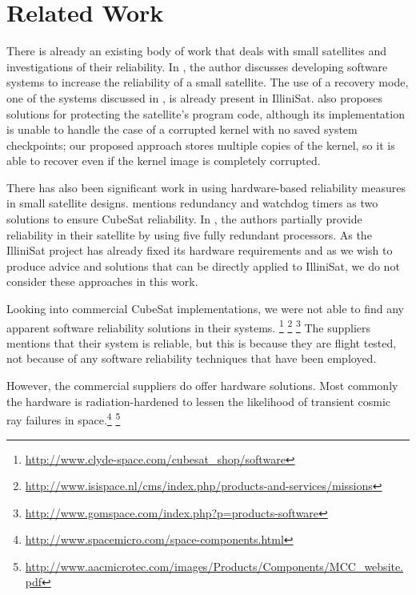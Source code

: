 \section{Related Work}\label{sec:related_work}
There is already an existing body of work that deals with small satellites and
investigations of their reliability.  In \cite{odegaard2013error}, the author
discusses developing software systems to increase the reliability of a small satellite.
The use of a recovery mode, one of the systems discussed in
\cite{odegaard2013error}, is already present in IlliniSat.
\cite{odegaard2013error} also proposes solutions for protecting the satellite's
program code, although its implementation is unable to handle the case of a
corrupted kernel with no saved system checkpoints; our proposed approach stores
multiple copies of the kernel, so it is able to recover even if the kernel image
is completely corrupted.

There has also been significant work in using hardware-based reliability measures in small satellite designs.  \cite{toorian2008cubesat} mentions redundancy and watchdog timers as two solutions to ensure CubeSat reliability.  In \cite{passerone2008design}, the authors partially provide reliability in their satellite by using five fully redundant processors.   As the IlliniSat project has already fixed its hardware requirements and as we wish to produce advice and solutions that can be directly applied to IlliniSat, we do not consider these approaches in this work.


Looking into commercial CubeSat implementations, we were not able to 
find any apparent software reliability solutions in their systems.
\footnote{\url{http://www.clyde-space.com/cubesat_shop/software}}
\footnote{\url{http://www.isispace.nl/cms/index.php/products-and-services/missions}}
\footnote{\url{http://www.gomspace.com/index.php?p=products-software}}
The suppliers mentions that their system is reliable, but this is because
they are flight tested, not because of any software reliability techniques that
have been employed.

However, the commercial suppliers do offer hardware solutions. Most commonly
the hardware is radiation-hardened to lessen the likelihood of transient cosmic ray
failures in space.\footnote{\url{http://www.spacemicro.com/space-components.html}}
\footnote{\url{http://www.aacmicrotec.com/images/Products/Components/MCC_website.pdf}}




